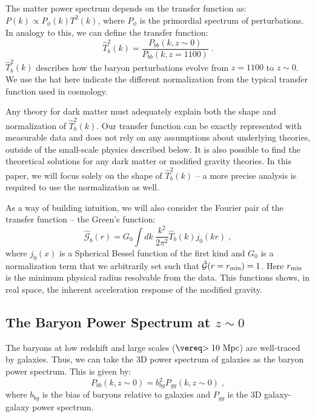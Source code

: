 \documentclass[floats,floatfix,showpacs,amssymb,amsmath,prl,twocolumn,superscriptaddress,nofootinbib, aps]{revtex4-2}
\begin{document}
The matter power spectrum depends on the transfer function as: $P(k) \propto P_{\phi}(k)T^2(k)$, where $P_{\phi}$ is the primordial spectrum of perturbations. In analogy to this, we can define the transfer function:
\begin{equation}
    \hat{T}_b^2(k) = \frac{P_{bb}(k, z\sim 0)}{P_{bb}(k,z=1100)} \; .
\end{equation}
$\hat{T}_b^2(k)$ describes how the baryon perturbations evolve from $z=1100$ to $z\sim 0$. We use the hat here indicate the different normalization from the typical transfer function used in cosmology.

Any theory for dark matter must adequately explain both the shape and normalization of $\hat{T}_b^2(k)$. Our transfer function can be exactly represented with measurable data and does not rely on any assumptions about underlying theories, outside of the small-scale physics described below. It is also possible to find the theoretical solutions for any dark matter or modified gravity theories. In this paper, we will focus solely on the shape of $\hat{T}_b^2(k)$ -- a more precise analysis is required to use the normalization as well.

As a way of building intuition, we will also consider the Fourier pair of the transfer function -- the Green's function:
\begin{equation}\label{eqn:greens}
    \hat{\mathcal{G}}_b(r) = G_0\int dk\ \frac{k^2}{2\pi^2} \hat{T}_b(k) j_0(kr) \; ,
\end{equation}
where $j_0(x)$ is a Spherical Bessel function of the first kind and $G_0$ is a normalization term that we arbitrarily set such that $\hat{\mathcal{G}}(r=r_{\rm{min}}) = 1$. Here $r_{\rm{min}}$ is the minimum physical radius resolvable from the data. This functions shows, in real space, the inherent acceleration response of the modified gravity. 


\subsection{The Baryon Power Spectrum at $z\sim0$}\label{sec:theory-lowz}
The baryons at low redshift and large scales ($\gtrsim 10~\rm{Mpc}$) are well-traced by galaxies. Thus, we can take the 3D power spectrum of galaxies as the baryon power spectrum. This is given by:
\begin{equation}
    P_{bb}(k, z\sim 0) = b_{bg}^2 P_{gg}(k, z\sim 0) \; ,
\end{equation}
where $b_{bg}$ is the bias of baryons relative to galaxies and $P_{gg}$ is the 3D galaxy-galaxy power spectrum. 
\end{document}
